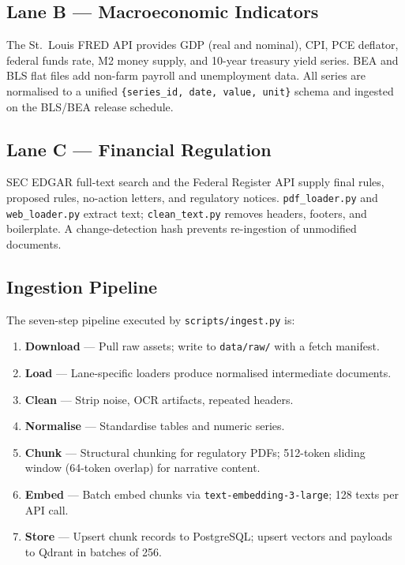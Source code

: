 \documentclass[10pt,a4paper,twocolumn]{article}
\begin{document}
\subsection{Lane B --- Macroeconomic Indicators}

The St.\ Louis FRED API provides GDP (real and nominal), CPI, PCE deflator, federal funds
rate, M2 money supply, and 10-year treasury yield series. BEA and BLS flat files add
non-farm payroll and unemployment data. All series are normalised to a unified
\texttt{\{series\_id, date, value, unit\}} schema and ingested on the BLS/BEA release schedule.

\subsection{Lane C --- Financial Regulation}

SEC EDGAR full-text search and the Federal Register API supply final rules, proposed rules,
no-action letters, and regulatory notices. \texttt{pdf\_loader.py} and \texttt{web\_loader.py}
extract text; \texttt{clean\_text.py} removes headers, footers, and boilerplate. A
change-detection hash prevents re-ingestion of unmodified documents.

\subsection{Ingestion Pipeline}

The seven-step pipeline executed by \texttt{scripts/ingest.py} is:

\begin{enumerate}[label=\textbf{S\arabic*.}]
  \item \textbf{Download} --- Pull raw assets; write to \texttt{data/raw/} with a fetch manifest.
  \item \textbf{Load} --- Lane-specific loaders produce normalised intermediate documents.
  \item \textbf{Clean} --- Strip noise, OCR artifacts, repeated headers.
  \item \textbf{Normalise} --- Standardise tables and numeric series.
  \item \textbf{Chunk} --- Structural chunking for regulatory PDFs; 512-token sliding window
        (64-token overlap) for narrative content.
  \item \textbf{Embed} --- Batch embed chunks via \texttt{text-embedding-3-large};
        128 texts per API call.
  \item \textbf{Store} --- Upsert chunk records to PostgreSQL; upsert vectors and payloads
        to Qdrant in batches of 256.
\end{enumerate}
\end{document}
